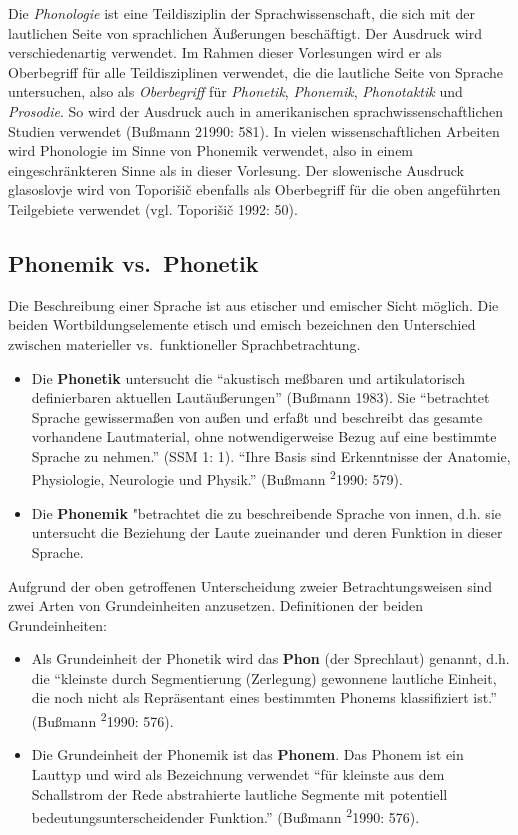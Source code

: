 \documentclass[
]{article}
\begin{document}
Die \emph{Phonologie} ist eine Teildisziplin der Sprachwissenschaft, die sich
mit der lautlichen Seite von sprachlichen Äußerungen beschäftigt. Der
Ausdruck wird verschiedenartig verwendet. Im Rahmen dieser Vorlesungen
wird er als Oberbegriff für alle Teildisziplinen verwendet, die die
lautliche Seite von Sprache untersuchen, also als \emph{Oberbegriff} für
\emph{Phonetik}, \emph{Phonemik}, \emph{Phonotaktik} und \emph{Prosodie}. So wird der
Ausdruck auch in amerikanischen sprachwissenschaftlichen Studien
verwendet (Bußmann 21990: 581). In vielen wissenschaftlichen Arbeiten
wird Phonologie im Sinne von Phonemik verwendet, also in einem
eingeschränkteren Sinne als in dieser Vorlesung. Der slowenische
Ausdruck glasoslovje wird von Toporišič ebenfalls als Oberbegriff für
die oben angeführten Teilgebiete verwendet (vgl. Toporišič 1992: 50).

\hypertarget{phonemik-vs.-phonetik}{%
\subsection{Phonemik vs.~Phonetik}\label{phonemik-vs.-phonetik}}

Die Beschreibung einer Sprache ist aus etischer und emischer Sicht
möglich. Die beiden Wortbildungselemente etisch und emisch bezeichnen
den Unterschied zwischen materieller vs.~funktioneller
Sprachbetrachtung.

\begin{itemize}
\item
  Die \textbf{Phonetik} untersucht die ``akustisch meßbaren und
  artikulatorisch definierbaren aktuellen Lautäußerungen'' (Bußmann
  1983). Sie ``betrachtet Sprache gewissermaßen von außen und erfaßt
  und beschreibt das gesamte vorhandene Lautmaterial, ohne
  notwendigerweise Bezug auf eine bestimmte Sprache zu nehmen.'' (SSM
  1: 1). ``Ihre Basis sind Erkenntnisse der Anatomie, Physiologie,
  Neurologie und Physik.'' (Bußmann \textsuperscript{2}1990: 579).
\item
  Die \textbf{Phonemik} "betrachtet die zu beschreibende Sprache von innen,
  d.h. sie untersucht die Beziehung der Laute zueinander und deren
  Funktion in dieser Sprache.
\end{itemize}

Aufgrund der oben getroffenen Unterscheidung zweier Betrachtungsweisen
sind zwei Arten von Grundeinheiten anzusetzen. Definitionen der beiden
Grundeinheiten:

\begin{itemize}
\item
  Als Grundeinheit der Phonetik wird das \textbf{Phon} (der Sprechlaut)
  genannt, d.h. die ``kleinste durch Segmentierung (Zerlegung)
  gewonnene lautliche Einheit, die noch nicht als Repräsentant eines
  bestimmten Phonems klassifiziert ist.'' (Bußmann \textsuperscript{2}1990: 576).
\item
  Die Grundeinheit der Phonemik ist das \textbf{Phonem}. Das Phonem ist ein
  Lauttyp und wird als Bezeichnung verwendet ``für kleinste aus dem
  Schallstrom der Rede abstrahierte lautliche Segmente mit potentiell
  bedeutungsunterscheidender Funktion.'' (Bußmann \textsuperscript{2}1990: 576).
\end{itemize}
\end{document}
